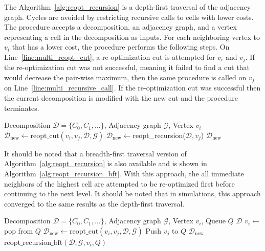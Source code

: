 \documentclass[../main.tex]{subfiles}
\begin{document}
The Algorithm~\ref{alg:reopt_recursion} is a depth-first traversal of the adjacency graph. Cycles are avoided by restricting recursive calls to cells with lower costs. The procedure accepts a decomposition, an adjacency graph, and a vertex representing a cell in the decomposition as inputs. For each neighboring vertex to $v_i$ that has a lower cost, the procedure performs the following steps. On Line~\ref{line:multi_reopt_cut}, a re-optimization cut is attempted for $v_i$ and $v_j$. If the re-optimization cut was not successful, meaning it failed to find a cut that would decrease the pair-wise maximum, then the same procedure is called on $v_j$ on Line~\ref{line:multi_recursive_call}. If the re-optimization cut was successful then the current decomposition is modified with the new cut and the procedure terminates.

\begin{algorithm}
	\caption{$\text{reopt\_recursion}(\mathcal{D}, \mathcal{G}, v_i)$}
	\label{alg:reopt_recursion}
	\begin{algorithmic}[1]
		\REQUIRE Decomposition $\mathcal{D}=\{C_0,C_1,\ldots\}$, Adjacency graph $\mathcal{G}$, Vertex $v_i$
					\STATE $\mathcal{D}_{\text{new}}\gets\text{reopt\_cut}(v_i,v_j,\mathcal{D},\mathcal{G})$ \label{line:multi_reopt_cut}
						\STATE $\mathcal{D}_{\text{new}}\gets$reopt\_recursion($\mathcal{D},v_j$)\label{line:multi_recursive_call}
					\ENDIF
					\RETURN $\mathcal{D}_{\text{new}}$
				\ENDIF
			\ENDFOR
	\end{algorithmic}
\end{algorithm}

It should be noted that a breadth-first traversal version of Algorithm~\ref{alg:reopt_recursion} is also available and is shown in Algorithm~\ref{alg:reopt_recursion_bft}. With this approach, the all immediate neighbors of the highest cell are attempted to be re-optimized first before continuing to the next level. It should be noted that in simulations, this approach converged to the same results as the depth-first traversal.

\begin{algorithm}
	\caption{$\text{reopt\_recursion\_bft}(\mathcal{D}, \mathcal{G}, v_i, Q)$}
	\label{alg:reopt_recursion_bft}
	\begin{algorithmic}[1]
		\REQUIRE Decomposition $\mathcal{D}=\{C_0,C_1,\ldots\}$, Adjacency graph $\mathcal{G}$, Vertex $v_i$, Queue $Q$
				\RETURN $\mathcal{D}$
			\ENDIF
			\STATE $v_i\gets$ pop from $Q$
					\STATE $\mathcal{D}_{\text{new}}\gets\text{reopt\_cut}(v_i,v_j,\mathcal{D},\mathcal{G})$ \label{line:multi_reopt_cut}
						\STATE Push $v_j$ to $Q$
					\ELSE
						\RETURN $\mathcal{D}_{\text{new}}$
					\ENDIF
				\ENDIF
			\ENDFOR
			\RETURN $\text{reopt\_recursion\_bft}(\mathcal{D}, \mathcal{G}, v_i, Q)$
	\end{algorithmic}
\end{algorithm}
\end{document}
